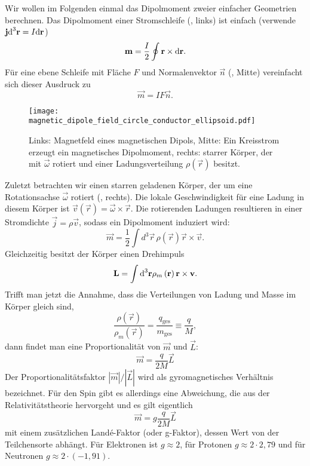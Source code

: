Wir wollen im Folgenden einmal das Dipolmoment zweier einfacher Geometrien berechnen. Das Dipolmoment einer Stromschleife (, links) ist einfach (verwende $\mathbf{j}\text{d} ^{3}\mathbf{r}=I\text{d} \mathbf{r}$)
\begin{equation*}
	\mathbf{m}=\frac{I}{2}\oint \mathbf{r}\times \text{d} \mathbf{r}.
\end{equation*}
Für eine ebene Schleife mit Fläche $F$ und Normalenvektor $\vec {n}$ (, Mitte) vereinfacht sich dieser Ausdruck zu
\begin{equation*}
	\vec {m}=IF\vec {n}.
\end{equation*}


\begin{figure}[htb]
	\centering
	\texttt{[image: magnetic\_dipole\_field\_circle\_conductor\_ellipsoid.pdf]}
	\caption{Links: Magnetfeld eines magnetischen Dipols, Mitte: Ein Kreisstrom erzeugt ein magnetisches Dipolmoment, rechts: starrer Körper, der mit $\vec\omega$ rotiert und einer Ladungsverteilung $\rho(\vec r)$ besitzt. }
	\label{fig:magnetic_dipole_field_circle_conductor_ellipsoid}
\end{figure}

Zuletzt betrachten wir einen starren geladenen Körper, der um eine Rotationsachse $\vec {\omega }$ rotiert (, rechts). Die lokale Geschwindigkeit für eine Ladung in diesem Körper ist $\vec {v}\left(\vec {r}\right)=\vec {\omega }\times \vec {r}$. Die rotierenden Ladungen resultieren in einer Stromdichte $\vec {j}=\rho \vec {v}$, sodass ein Dipolmoment induziert wird:
\begin{equation*}
	\vec {m}=\frac{1}{2}\int d^{3}\vec {r}\,\rho \left(\vec {r}\right)\vec {r}\times \vec {v}.
\end{equation*}
Gleichzeitig besitzt der Körper einen Drehimpuls
\begin{equation*}
	\mathbf{L}=\int \text{d} ^{3}\mathbf{r}\rho _{m}\left(\mathbf{r}\right)\mathbf{r}\times \mathbf{v}.
\end{equation*}
Trifft man jetzt die Annahme, dass die Verteilungen von Ladung und Masse im Körper gleich sind,
\begin{equation*}
	\frac{\rho \left(\vec {r}\right)}{\rho _{m}\left(\vec {r}\right)}=\frac{q_{\mathrm{ges}}}{m_{\mathrm{ges}}}\equiv \frac{q}{M},
\end{equation*}
dann findet man eine Proportionalität von $\vec {m}$ und $\vec {L}$:
\begin{equation*}
	\vec {m}=\frac{q}{2M}\vec {L}
\end{equation*}
Der Proportionalitätsfaktor $\left| \vec {m}\right| /\left| \vec {L}\right| $ wird als gyromagnetisches Verhältnis bezeichnet. Für den Spin gibt es allerdings eine Abweichung, die aus der Relativitätstheorie hervorgeht und es gilt eigentlich
\begin{equation*}
	\vec {m}=g\frac{q}{2M}\vec {L}
\end{equation*}
mit einem zusätzlichen Landé-Faktor (oder g-Faktor), dessen Wert von der Teilchensorte abhängt. Für Elektronen ist $g\approx 2$, für Protonen $g\approx 2\cdot 2,79$ und für Neutronen $g\approx 2\cdot \left(-1,91\right)$.

